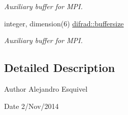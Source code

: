 \begin{DoxyCompactItemize}
\begin{DoxyCompactList}\small\item\em Auxiliary buffer for M\+P\+I. \end{DoxyCompactList}\item 
\hypertarget{namespacedifrad_a1d5243b742ea3504f1b6b09132417333}{}integer, dimension(6) \hyperlink{namespacedifrad_a1d5243b742ea3504f1b6b09132417333}{difrad\+::buffersize}\label{namespacedifrad_a1d5243b742ea3504f1b6b09132417333}

\begin{DoxyCompactList}\small\item\em Auxiliary buffer for M\+P\+I. \end{DoxyCompactList}\end{DoxyCompactItemize}


\subsection{Detailed Description}
\begin{DoxyAuthor}{Author}
Alejandro Esquivel 
\end{DoxyAuthor}
\begin{DoxyDate}{Date}
2/\+Nov/2014 
\end{DoxyDate}
